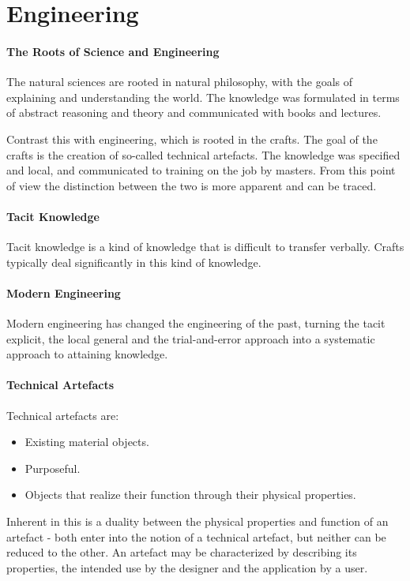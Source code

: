 \section{Engineering}

\paragraph{The Roots of Science and Engineering}
The natural sciences are rooted in natural philosophy, with the goals of explaining and understanding the world. The knowledge was formulated in terms of abstract reasoning and theory and communicated with books and lectures.

Contrast this with engineering, which is rooted in the crafts. The goal of the crafts is the creation of so-called technical artefacts. The knowledge was specified and local, and communicated to training on the job by masters. From this point of view the distinction between the two is more apparent and can be traced.

\paragraph{Tacit Knowledge}
Tacit knowledge is a kind of knowledge that is difficult to transfer verbally. Crafts typically deal significantly in this kind of knowledge.

\paragraph{Modern Engineering}
Modern engineering has changed the engineering of the past, turning the tacit explicit, the local general and the trial-and-error approach into a systematic approach to attaining knowledge.

\paragraph{Technical Artefacts}
Technical artefacts are:
\begin{itemize}
	\item Existing material objects.
	\item Purposeful.
	\item Objects that realize their function through their physical properties.
\end{itemize}

Inherent in this is a duality between the physical properties and function of an artefact - both enter into the notion of a technical artefact, but neither can be reduced to the other. An artefact may be characterized by describing its properties, the intended use by the designer and the application by a user.


